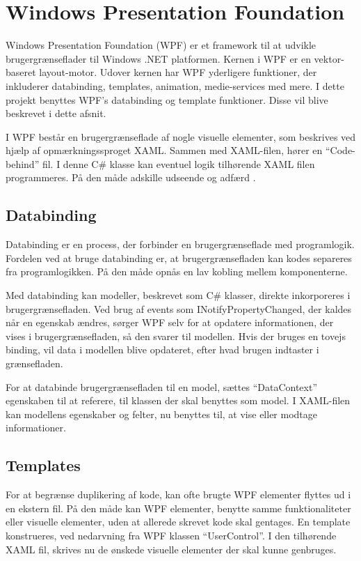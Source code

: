 \section{Windows Presentation Foundation}

Windows Presentation Foundation (WPF) er et framework til at udvikle brugergrænseflader til Windows .NET platformen. Kernen i WPF er en vektor-baseret layout-motor. Udover kernen har WPF yderligere funktioner, der inkluderer databinding, templates, animation, medie-services med mere. I dette projekt benyttes WPF's databinding og template funktioner. Disse vil blive beskrevet i dette afsnit.

I WPF består en brugergrænseflade af nogle visuelle elementer, som beskrives ved hjælp af opmærkningssproget XAML. Sammen med XAML-filen, hører en \enquote{Code-behind} fil. I denne C\# klasse kan eventuel logik tilhørende XAML filen programmeres. På den måde adskille udseende og adfærd \cite{microsoft_wpf}.

\subsection{Databinding}

Databinding er en process, der forbinder en brugergrænseflade med programlogik. Fordelen ved at bruge databinding er, at brugergrænsefladen kan kodes separeres fra programlogikken. På den måde opnås en lav kobling mellem komponenterne.

Med databinding kan modeller, beskrevet som C\# klasser, direkte inkorporeres i brugergrænsefladen. Ved brug af events som INotifyPropertyChanged, der kaldes når en egenskab ændres, sørger WPF selv for at opdatere informationen, der vises i brugergrænsefladen, så den svarer til modellen. Hvis der bruges en tovejs binding, vil data i modellen blive opdateret, efter hvad brugen indtaster i grænsefladen.

For at databinde brugergrænsefladen til en model, sættes \enquote{DataContext} egenskaben til at referere, til klassen der skal benyttes som model. I XAML-filen kan modellens egenskaber og felter, nu benyttes til, at vise eller modtage informationer.

\subsection{Templates}

For at begrænse duplikering af kode, kan ofte brugte WPF elementer flyttes ud i en ekstern fil. På den måde kan WPF elementer, benytte samme funktionaliteter eller visuelle elementer, uden at allerede skrevet kode skal gentages. En template konstrueres, ved nedarvning fra WPF klassen \enquote{UserControl}. I den tilhørende XAML fil, skrives nu de ønskede visuelle elementer der skal kunne genbruges.
